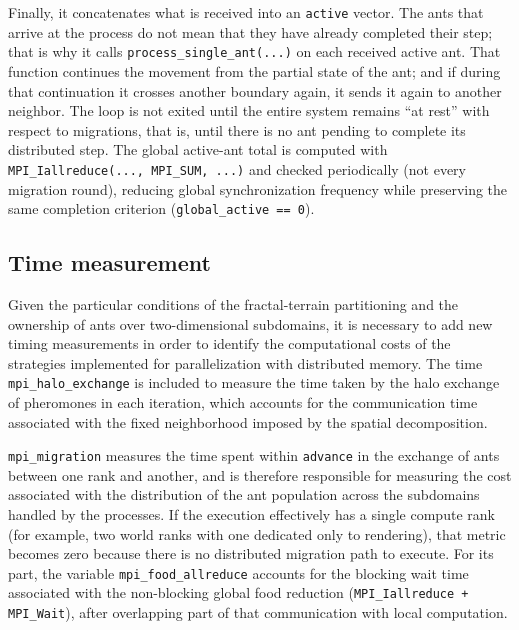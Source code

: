 Finally, it concatenates what is received into an \texttt{active} vector. The ants that arrive at the process do not mean that they have already completed their step; that is why it calls \texttt{process\_single\_ant(...)} on each received active ant. That function continues the movement from the partial state of the ant; and if during that continuation it crosses another boundary again, it sends it again to another neighbor. The loop is not exited until the entire system remains ``at rest'' with respect to migrations, that is, until there is no ant pending to complete its distributed step. The global active-ant total is computed with \texttt{MPI\_Iallreduce(..., MPI\_SUM, ...)} and checked periodically (not every migration round), reducing global synchronization frequency while preserving the same completion criterion (\texttt{global\_active == 0}).


\subsection{Time measurement}

Given the particular conditions of the fractal-terrain partitioning and the ownership of ants over two-dimensional subdomains, it is necessary to add new timing measurements in order to identify the computational costs of the strategies implemented for parallelization with distributed memory. The time \texttt{mpi\_halo\_exchange} is included to measure the time taken by the halo exchange of pheromones in each iteration, which accounts for the communication time associated with the fixed neighborhood imposed by the spatial decomposition.

\texttt{mpi\_migration} measures the time spent within \texttt{advance} in the exchange of ants between one rank and another, and is therefore responsible for measuring the cost associated with the distribution of the ant population across the subdomains handled by the processes. If the execution effectively has a single compute rank (for example, two world ranks with one dedicated only to rendering), that metric becomes zero because there is no distributed migration path to execute. For its part, the variable \texttt{mpi\_food\_allreduce} accounts for the blocking wait time associated with the non-blocking global food reduction (\texttt{MPI\_Iallreduce + MPI\_Wait}), after overlapping part of that communication with local computation.

